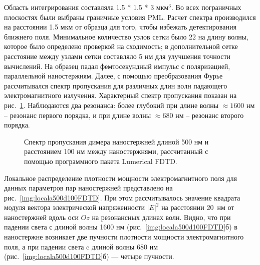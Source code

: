 Область интегрирования составляла 1.5 * 1.5 * 3 мкм$ ^3 $. Во всех пограничных плоскостях были выбраны граничные условия PML. Расчет спектра производился на расстоянии 1.5 мкм от образца для того, чтобы избежать детектирования ближнего поля. Минимальное количество узлов сетки было 22 на длину волны, которое было определено проверкой на сходимость; в дополнительной сетке расстояние между узлами сетки составляло 5 нм для улучшения точности вычислений. На образец падал фемтосекундный импульс с поляризацией, параллельной наностержням. Далее, с помощью преобразования Фурье рассчитывался спектр пропускания для различных длин волн падающего электромагнитного излучения. Характерный спектр пропускания показан на рис.~\ref{img:spectraFDTDa500d100}. Наблюдаются два резонанса: более глубокий при длине волны $ \approx 1600 $ нм  -- резонанс первого порядка, и при длине волны $ \approx 680 $ нм -- резонанс второго порядка.
\begin{figure}
\caption{Спектр пропускания димера наностержней длиной 500 нм и расстоянием 100 нм между наностержнями, рассчитанный с помощью программного пакета Lumerical FDTD.}
\label{img:spectraFDTDa500d100}
\end{figure}

Локальное распределение плотности мощности электромагнитного поля для данных параметров пар наностержней представлено на рис.~\ref{img:locala500d100FDTD}. При этом рассчитывалось значение квадрата модуля вектора электрической напряженности $ \lvert E \rvert ^2 $ на расстоянии 20~нм от наностержней вдоль оси $ Oz $ на резонансных длинах волн. Видно, что при падении света с длиной волны 1600 нм (рис.~\ref{img:locala500d100FDTD}б) в наностержне возникает две пучности плотности мощности электромагнитного поля, а при падении света c длиной волны 680 нм (рис.~\ref{img:locala500d100FDTD}б) --- четыре пучности.

